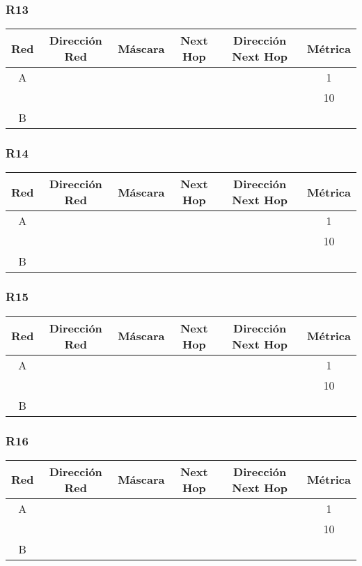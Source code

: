 \documentclass[12pt,a4paper,spanish]{article}
\begin{document}
\subsubsection{R13}
\begin{tabular}{|c|c|c|c|c|c|}
	\hline
	Red & Dirección Red & Máscara & Next Hop & Dirección Next Hop & Métrica \\
	\hline
	\hline
	A &  &  &  &  & 1\\
 	  &  &  &  &  & 10 \\
	\hline	
	B & & & & &\\
	\hline
\end{tabular}

\subsubsection{R14}
\begin{tabular}{|c|c|c|c|c|c|}
	\hline
	Red & Dirección Red & Máscara & Next Hop & Dirección Next Hop & Métrica \\
	\hline
	\hline
	A &  &  &  &  & 1\\
 	  &  &  &  &  & 10 \\
	\hline	
	B & & & & &\\
	\hline
\end{tabular}

\subsubsection{R15}
\begin{tabular}{|c|c|c|c|c|c|}
	\hline
	Red & Dirección Red & Máscara & Next Hop & Dirección Next Hop & Métrica \\
	\hline
	\hline
	A &  &  &  &  & 1\\
 	  &  &  &  &  & 10 \\
	\hline	
	B & & & & &\\
	\hline
\end{tabular}

\subsubsection{R16}
\begin{tabular}{|c|c|c|c|c|c|}
	\hline
	Red & Dirección Red & Máscara & Next Hop & Dirección Next Hop & Métrica \\
	\hline
	\hline
	A &  &  &  &  & 1\\
 	  &  &  &  &  & 10 \\
	\hline	
	B & & & & &\\
	\hline
\end{tabular}
\end{document}
